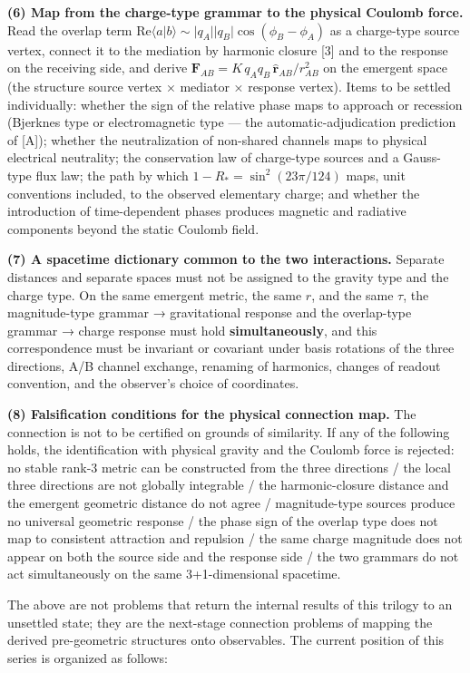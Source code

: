 \documentclass[
  a4paper,
]{article}
\begin{document}
\textbf{(6) Map from the charge-type grammar to the physical Coulomb
force.} Read the overlap term
\(\mathrm{Re}\langle a|b\rangle\sim|q_A||q_B|\cos(\phi_B-\phi_A)\) as a
charge-type source vertex, connect it to the mediation by harmonic
closure {[}3{]} and to the response on the receiving side, and derive
\(\mathbf F_{AB}=K\,q_Aq_B\,\hat{\mathbf r}_{AB}/r_{AB}^2\) on the
emergent space (the structure source vertex × mediator × response
vertex). Items to be settled individually: whether the sign of the
relative phase maps to approach or recession (Bjerknes type or
electromagnetic type --- the automatic-adjudication prediction of
{[}A{]}); whether the neutralization of non-shared channels maps to
physical electrical neutrality; the conservation law of charge-type
sources and a Gauss-type flux law; the path by which
\(1-R_\ast=\sin^2(23\pi/124)\) maps, unit conventions included, to the
observed elementary charge; and whether the introduction of
time-dependent phases produces magnetic and radiative components beyond
the static Coulomb field.

\textbf{(7) A spacetime dictionary common to the two interactions.}
Separate distances and separate spaces must not be assigned to the
gravity type and the charge type. On the same emergent metric, the same
\(r\), and the same \(\tau\), the magnitude-type grammar → gravitational
response and the overlap-type grammar → charge response must hold
\textbf{simultaneously}, and this correspondence must be invariant or
covariant under basis rotations of the three directions, A/B channel
exchange, renaming of harmonics, changes of readout convention, and the
observer's choice of coordinates.

\textbf{(8) Falsification conditions for the physical connection map.}
The connection is not to be certified on grounds of similarity. If any
of the following holds, the identification with physical gravity and the
Coulomb force is rejected: no stable rank-3 metric can be constructed
from the three directions / the local three directions are not globally
integrable / the harmonic-closure distance and the emergent geometric
distance do not agree / magnitude-type sources produce no universal
geometric response / the phase sign of the overlap type does not map to
consistent attraction and repulsion / the same charge magnitude does not
appear on both the source side and the response side / the two grammars
do not act simultaneously on the same 3+1-dimensional spacetime.

The above are not problems that return the internal results of this
trilogy to an unsettled state; they are the next-stage connection
problems of mapping the derived pre-geometric structures onto
observables. The current position of this series is organized as
follows:
\end{document}
